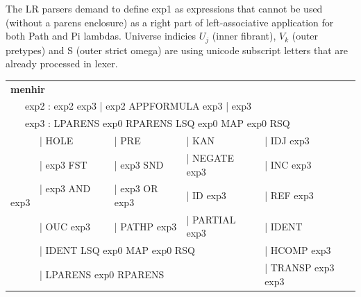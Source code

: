 \documentclass[a4paper,UKenglish,cleveref, autoref, thm-restate]{lipics-v2021}
\newcommand{\tabstyle}[0]{\scriptsize\ttfamily\fontseries{l}\selectfont}
\begin{document}
The LR parsers demand to define exp1 as expressions that cannot be used (without a parens enclosure)
as a right part of left-associative application for both Path and Pi lambdas.
Universe indicies $U_j$ (inner fibrant), $V_k$ (outer pretypes) and S (outer strict omega)
are using unicode subscript letters that are already processed in lexer.

\begin{table}[ht!]
\tabstyle
\begin{tabular}{llll}
\textbf{menhir} \\
\multicolumn{3}{l}{\ \ \ exp2 : exp2 exp3 | exp2 APPFORMULA exp3 | exp3 } \\
\multicolumn{4}{l}{\ \ \ exp3 : LPARENS exp0 RPARENS LSQ exp0 MAP exp0 RSQ } \\
\ \ \ \ \ \   | HOLE              & | PRE          & | KAN          & | IDJ exp3 \\
\ \ \ \ \ \   | exp3 FST          & | exp3 SND     & | NEGATE exp3  & | INC exp3 \\
\ \ \ \ \ \   | exp3 AND exp3     & | exp3 OR exp3 & | ID exp3      & | REF exp3\\
\ \ \ \ \ \   | OUC exp3          & | PATHP exp3   & | PARTIAL exp3 & | IDENT \\
\multicolumn{3}{l}{\ \ \ \ \ \    | IDENT LSQ exp0 MAP exp0 RSQ }   & | HCOMP exp3 \\
\multicolumn{3}{l}{\ \ \ \ \ \    | LPARENS exp0 RPARENS }          & | TRANSP exp3 exp3 \\
\end{tabular}
\end{table}


\newpage
\end{document}
